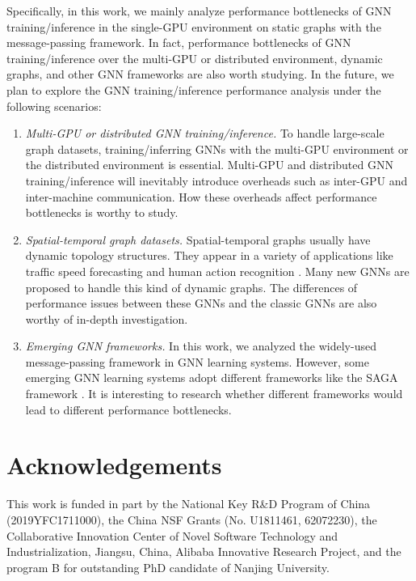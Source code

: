 Specifically, in this work, we mainly analyze performance bottlenecks of GNN training/inference in the single-GPU environment on static graphs with the message-passing framework.
%
In fact, performance bottlenecks of GNN training/inference over the multi-GPU or distributed environment, dynamic graphs, and other GNN frameworks are also worth studying.
%
In the future, we plan to explore the GNN training/inference performance analysis under the following scenarios:
%
\begin{enumerate}
    \item \emph{Multi-GPU or distributed GNN training/inference.}
    To handle large-scale graph datasets, training/inferring GNNs with the multi-GPU environment or the distributed environment is essential.
    Multi-GPU and distributed GNN training/inference will inevitably introduce overheads such as inter-GPU and inter-machine communication. 
    How these overheads affect performance bottlenecks is worthy to study.
    \item \emph{Spatial-temporal graph datasets.}
    Spatial-temporal graphs usually have dynamic topology structures.
    They appear in a variety of applications like traffic speed forecasting \cite{li2018_DCRNN} and human action recognition \cite{yan2018_STGCN}.
    Many new GNNs are proposed to handle this kind of dynamic graphs.
    The differences of performance issues between these GNNs and the classic GNNs are also worthy of in-depth investigation.
    \item \emph{Emerging GNN frameworks.}
    In this work, we analyzed the widely-used message-passing framework in GNN learning systems.
    However, some emerging GNN learning systems adopt different frameworks like the SAGA framework \cite{ma2019_neugraph}.
    It is interesting to research whether different frameworks would lead to different performance bottlenecks.
\end{enumerate}

\section*{Acknowledgements}

This work is funded in part by the National Key R\&D Program of China (2019YFC1711000), the China NSF Grants (No. U1811461, 62072230), the Collaborative Innovation Center of Novel Software Technology and Industrialization, Jiangsu, China, Alibaba Innovative Research Project, and the program B for outstanding PhD candidate of Nanjing University.

